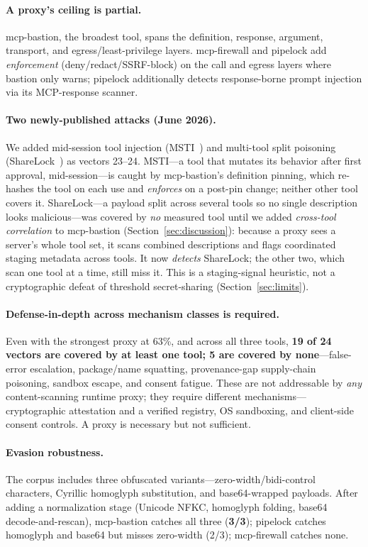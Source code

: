 \documentclass[sigconf,review]{acmart}
\begin{document}
\paragraph{A proxy's ceiling is partial.} mcp-bastion, the broadest tool, spans the definition, response, argument, transport, and egress/least-privilege layers. mcp-firewall and pipelock add \emph{enforcement} (deny/redact/SSRF-block) on the call and egress layers where bastion only warns; pipelock additionally detects response-borne prompt injection via its MCP-response scanner.

\paragraph{Two newly-published attacks (June 2026).} We added mid-session tool injection (MSTI~\cite{msti2606}) and multi-tool split poisoning (ShareLock~\cite{sharelock2606}) as vectors 23--24. MSTI---a tool that mutates its behavior after first approval, mid-session---is caught by mcp-bastion's definition pinning, which re-hashes the tool on each use and \emph{enforces} on a post-pin change; neither other tool covers it. ShareLock---a payload split across several tools so no single description looks malicious---was covered by \emph{no} measured tool until we added \emph{cross-tool correlation} to mcp-bastion (Section~\ref{sec:discussion}): because a proxy sees a server's whole tool set, it scans combined descriptions and flags coordinated staging metadata across tools. It now \emph{detects} ShareLock; the other two, which scan one tool at a time, still miss it. This is a staging-signal heuristic, not a cryptographic defeat of threshold secret-sharing (Section~\ref{sec:limits}).

\paragraph{Defense-in-depth across mechanism classes is required.} Even with the strongest proxy at 63\%, and across all three tools, \textbf{19 of 24 vectors are covered by at least one tool; 5 are covered by none}---false-error escalation, package/name squatting, provenance-gap supply-chain poisoning, sandbox escape, and consent fatigue. These are not addressable by \emph{any} content-scanning runtime proxy; they require different mechanisms---cryptographic attestation and a verified registry, OS sandboxing, and client-side consent controls. A proxy is necessary but not sufficient.

\paragraph{Evasion robustness.} The corpus includes three obfuscated variants---zero-width/bidi-control characters, Cyrillic homoglyph substitution, and base64-wrapped payloads. After adding a normalization stage (Unicode NFKC, homoglyph folding, base64 decode-and-rescan), mcp-bastion catches all three (\textbf{3/3}); pipelock catches homoglyph and base64 but misses zero-width (2/3); mcp-firewall catches none.
\end{document}
